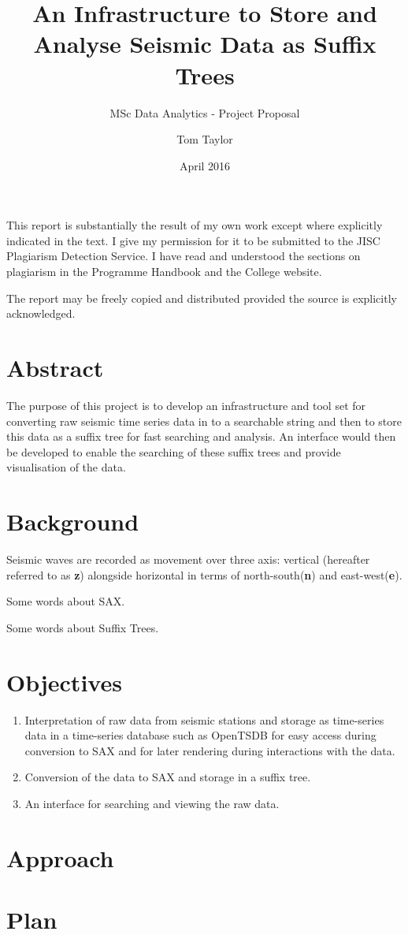 \documentclass[11pt]{scrartcl}
\title{An Infrastructure to Store and Analyse Seismic Data as Suffix Trees}
\subtitle{MSc Data Analytics - Project Proposal}
\date{April 2016}
\author{Tom Taylor}
\begin{document}
\maketitle
\begin{itshape}
	\noindent This report is substantially the result of my own work except where explicitly
	indicated in the text. I give my permission for it to be submitted to the JISC
	Plagiarism Detection Service. I have read and understood the sections on plagiarism
	in the Programme Handbook and the College website.
	
	\noindent The report may be freely copied and distributed provided the source is explicitly
	acknowledged.
\end{itshape}

\tableofcontents

\newpage

\section{Abstract}
	The purpose of this project is to develop an infrastructure and tool set for converting raw seismic time series data in to a searchable string and then to store this data as a suffix tree for fast searching and analysis.  An interface would then be developed to enable the searching of these suffix trees and provide visualisation of the data.
	
\section{Background}
	Seismic waves are recorded as movement over three axis: vertical (hereafter referred to as \textbf{z}) alongside horizontal in terms of north-south(\textbf{n}) and east-west(\textbf{e}).
	
	Some words about SAX.
	
	Some words about Suffix Trees.

\section{Objectives}
\begin{enumerate}
	\item Interpretation of raw data from seismic stations and storage as time-series data in a time-series database such as OpenTSDB for easy access during conversion to SAX and for later rendering during interactions with the data.
	\item Conversion of the data to SAX and storage in a suffix tree.
	\item An interface for searching and viewing the raw data.
\end{enumerate}

\section{Approach}

\section{Plan}
\end{document}
